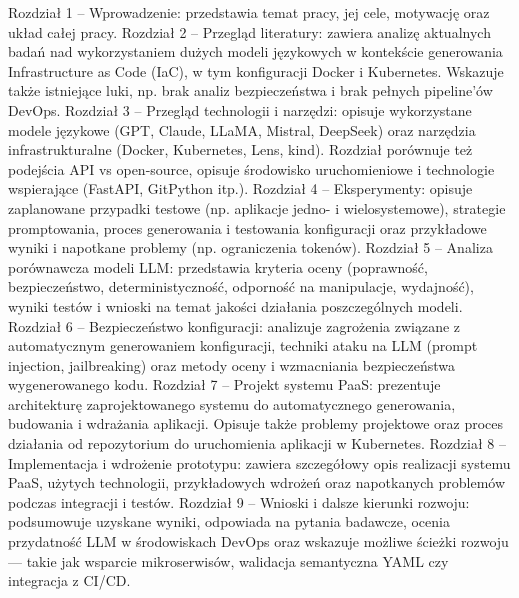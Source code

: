 Rozdział 1 – Wprowadzenie: przedstawia temat pracy, jej cele, motywację oraz układ całej pracy.
Rozdział 2 – Przegląd literatury: zawiera analizę aktualnych badań nad wykorzystaniem dużych modeli językowych w kontekście generowania Infrastructure as Code (IaC), w tym konfiguracji Docker i Kubernetes. Wskazuje także istniejące luki, np. brak analiz bezpieczeństwa i brak pełnych pipeline’ów DevOps.
Rozdział 3 – Przegląd technologii i narzędzi: opisuje wykorzystane modele językowe (GPT, Claude, LLaMA, Mistral, DeepSeek) oraz narzędzia infrastrukturalne (Docker, Kubernetes, Lens, kind). Rozdział porównuje też podejścia API vs open-source, opisuje środowisko uruchomieniowe i technologie wspierające (FastAPI, GitPython itp.).
Rozdział 4 – Eksperymenty: opisuje zaplanowane przypadki testowe (np. aplikacje jedno- i wielosystemowe), strategie promptowania, proces generowania i testowania konfiguracji oraz przykładowe wyniki i napotkane problemy (np. ograniczenia tokenów).
Rozdział 5 – Analiza porównawcza modeli LLM: przedstawia kryteria oceny (poprawność, bezpieczeństwo, deterministyczność, odporność na manipulacje, wydajność), wyniki testów i wnioski na temat jakości działania poszczególnych modeli.
Rozdział 6 – Bezpieczeństwo konfiguracji: analizuje zagrożenia związane z automatycznym generowaniem konfiguracji, techniki ataku na LLM (prompt injection, jailbreaking) oraz metody oceny i wzmacniania bezpieczeństwa wygenerowanego kodu.
Rozdział 7 – Projekt systemu PaaS: prezentuje architekturę zaprojektowanego systemu do automatycznego generowania, budowania i wdrażania aplikacji. Opisuje także problemy projektowe oraz proces działania od repozytorium do uruchomienia aplikacji w Kubernetes.
Rozdział 8 – Implementacja i wdrożenie prototypu: zawiera szczegółowy opis realizacji systemu PaaS, użytych technologii, przykładowych wdrożeń oraz napotkanych problemów podczas integracji i testów.
Rozdział 9 – Wnioski i dalsze kierunki rozwoju: podsumowuje uzyskane wyniki, odpowiada na pytania badawcze, ocenia przydatność LLM w środowiskach DevOps oraz wskazuje możliwe ścieżki rozwoju — takie jak wsparcie mikroserwisów, walidacja semantyczna YAML czy integracja z CI/CD.